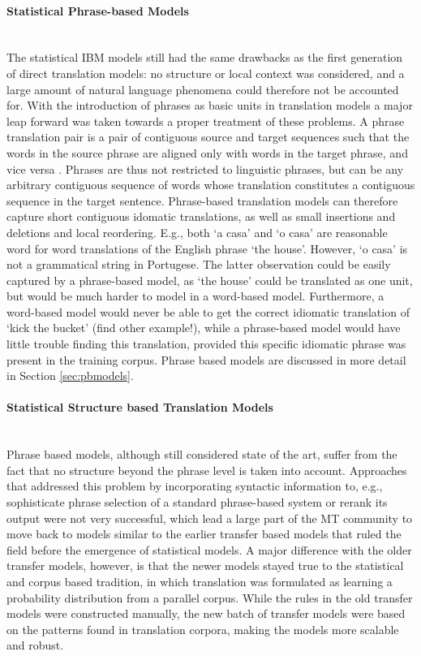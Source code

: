 \documentclass{report}
\newcommand{\myparagraph}[1]{\paragraph{#1}\mbox{}\\}
\theoremstyle{definition}
\theoremstyle{plain}
\begin{document}
\myparagraph{Statistical Phrase-based Models}
The statistical IBM models still had the same drawbacks as the first generation of direct translation models: no structure or local context was considered, and a large amount of natural language phenomena could therefore not be accounted for. With the introduction of phrases as basic units in translation models \citep{wang1998grammar,och1999improved} a major leap forward was taken towards a proper treatment of these problems. A phrase translation pair is a pair of contiguous source and target sequences such that the words in the source phrase are aligned only with words in the target phrase, and vice versa \citep{och2000improved}. Phrases are thus not restricted to linguistic phrases, but can be any arbitrary contiguous sequence of words whose translation constitutes a contiguous sequence in the target sentence. Phrase-based translation models can therefore capture short contiguous idomatic translations, as well as small insertions and deletions and local reordering. 
E.g., both `a casa' and `o casa' are reasonable word for word translations of the English phrase `the house'. However, `o casa' is not a grammatical string in Portugese. The latter observation could be easily captured by a phrase-based model, as `the house' could be translated as one unit, but would be much harder to model in a word-based model. Furthermore, a word-based model would never be able to get the correct idiomatic translation of `kick the bucket' (find other example!), while a phrase-based model would have little trouble finding this translation, provided this specific idiomatic phrase was present in the training corpus. Phrase based models are discussed in more detail in Section \ref{sec:pbmodels}.

\myparagraph{Statistical Structure based Translation Models}
Phrase based models, although still considered state of the art, suffer from the fact that no structure beyond the phrase level is taken into account. Approaches that addressed this problem by incorporating syntactic information to, e.g., sophisticate phrase selection of a standard phrase-based system \citep{koehn2003statistical} or rerank its output \citep{och2004alignment} were not very successful, which lead a large part of the MT community to move back to models similar to the earlier transfer based models that ruled the field before the emergence of statistical models. A major difference with the older transfer models, however, is that the newer models stayed true to the statistical and corpus based tradition, in which translation was formulated as learning a probability distribution from a parallel corpus. While the rules in the old transfer models were constructed manually, the new batch of transfer models were based on the patterns found in translation corpora, making the models more scalable and robust.
\end{document}
